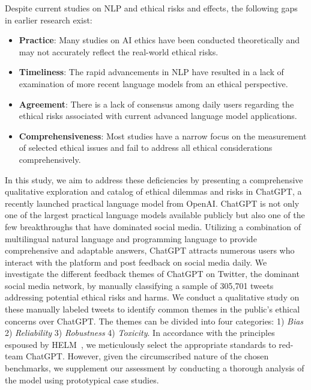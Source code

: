 Despite current studies on NLP and ethical risks and effects, the following gaps in earlier research exist:
\begin{itemize}
    \item \textbf{Practice}: Many studies on AI ethics have been conducted theoretically and may not accurately reflect the real-world ethical risks.
    \item \textbf{Timeliness}: The rapid advancements in NLP have resulted in a lack of examination of more recent language models from an ethical perspective.
    \item \textbf{Agreement}: There is a lack of consensus among daily users regarding the ethical risks associated with current advanced language model applications.
    \item \textbf{Comprehensiveness}: Most studies have a narrow focus on the measurement of selected ethical issues and fail to address all ethical considerations comprehensively.
\end{itemize}

In this study, we aim to address these deficiencies by presenting a comprehensive qualitative exploration and catalog of ethical dilemmas and risks in ChatGPT, a recently launched practical language model from OpenAI. ChatGPT is not only one of the largest practical language models available publicly but also one of the few breakthroughs that have dominated social media. Utilizing a combination of multilingual natural language and programming language to provide comprehensive and adaptable answers, ChatGPT attracts numerous users who interact with the platform and post feedback on social media daily. We investigate the different feedback themes of ChatGPT on Twitter, the dominant social media network, by manually classifying a sample of 305,701 tweets addressing potential ethical risks and harms. We conduct a qualitative study on these manually labeled tweets to identify common themes in the public's ethical concerns over ChatGPT. The themes can be divided into four categories: 1) \textit{Bias} 2) \textit{Reliability} 3) \textit{Robustness} 4) \textit{Toxicity}. In accordance with the principles espoused by HELM~\cite{liang2022holistic}, we meticulously select the appropriate standards to red-team ChatGPT. However, given the circumscribed nature of the chosen benchmarks, we supplement our assessment by conducting a thorough analysis of the model using prototypical case studies.



